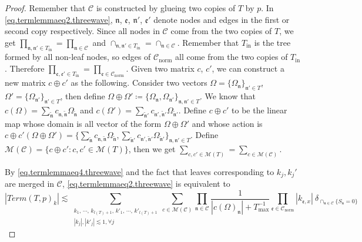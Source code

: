 \begin{proof}
Remember that $\mathcal{C}$ is constructed by glueing two copies of $T$ by $p$. In \eqref{eq.termlemmaeq2.threewave}, $\mathfrak{n}$, $\mathfrak{e}$, $\mathfrak{n}'$, $\mathfrak{e}'$ denote nodes and edges in the first or second copy respectively. Since all nodes in $\mathcal{C}$ come from the two copies of $T$, we get $\prod_{\mathfrak{n}, \mathfrak{n}'\in T_{\text{in}}}=\prod_{\mathfrak{n}\in \mathcal{C}}$ and $\cap_{\mathfrak{n},\mathfrak{n}'\in T_{\text{in}}}=\cap_{\mathfrak{n}\in \mathcal{C}}$. Remember that $T_{\text{in}}$ is the tree formed by all non-leaf nodes, so edges of $\mathcal{C}_{\text{norm}}$ all come from the two copies of $T_{\text{in}}$. Therefore $\prod_{\mathfrak{e},\mathfrak{e}'\in T_{\text{in}}}=\prod_{\mathfrak{e}\in \mathcal{C}_{\text{norm}}}$. Given two matrix $c$, $c'$, we can construct a new matrix $c\oplus c'$ as the following. Consider two vectors $\Omega=\{\Omega_{\mathfrak{n}}\}_{\mathfrak{n}'\in T}$, $\Omega'=\{\Omega_{\mathfrak{n}'}\}_{\mathfrak{n}'\in T}$, then define $\Omega\oplus\Omega'\coloneqq \{\Omega_{\mathfrak{n}},\Omega_{\mathfrak{n}'}\}_{\mathfrak{n},\mathfrak{n}'\in T}$. We know that $c(\Omega)=\sum_{\widetilde{\mathfrak{n}}}c_{\mathfrak{n},\widetilde{\mathfrak{n}}}\Omega_{\widetilde{\mathfrak{n}}}$ and $c(\Omega')=\sum_{\widetilde{\mathfrak{n}}'}c_{\mathfrak{n}',\widetilde{\mathfrak{n}}'}\Omega_{\widetilde{\mathfrak{n}}'}$. Define $c\oplus c'$ to be the linear map whose domain is all vector of the form $\Omega\oplus\Omega'$ and whose action is $c\oplus c'(\Omega\oplus\Omega')=\{\sum_{\widetilde{\mathfrak{n}}}c_{\mathfrak{n},\widetilde{\mathfrak{n}}}\Omega_{\widetilde{\mathfrak{n}}},\sum_{\widetilde{\mathfrak{n}}'}c_{\mathfrak{n}',\widetilde{\mathfrak{n}}'}\Omega_{\widetilde{\mathfrak{n}}'}\}_{\mathfrak{n},\mathfrak{n}'\in T}$. Define $\mathscr{M}(\mathcal{C})=\{c\oplus c':c, c'\in \mathscr{M}(T)\}$, then we get $\sum_{c, c'\in \mathscr{M}(T) }=\sum_{c\in \mathscr{M}(\mathcal{C}) }$.



By \eqref{eq.termlemmaeq4.threewave} and the fact that leaves corresponding to $k_j, k_j'$ are merged in $\mathcal{C}$, \eqref{eq.termlemmaeq2.threewave} is equivalent to 
\begin{equation}\label{eq.termlemmaeq5.threewave}
|Term(T, p)_k|\lesssim \sum_{\substack{k_1,\, \cdots,\, k_{l(T)+1},\, k'_1,\, \cdots,\, k'_{l(T)+1}\\ |k_{j}|, |k'_j|\lesssim 1, \forall j}} \sum_{c\in \mathscr{M}(\mathcal{C}) }\prod_{\mathfrak{n}\in \mathcal{C}}\frac{1}{|c(\Omega)_{\mathfrak{n}}|+T^{-1}_{\text{max}}} \prod_{\mathfrak{e}\in \mathcal{C}_{\text{norm}}}|k_{\mathfrak{e},x}|\ \delta_{\cap_{\mathfrak{n}\in \mathcal{C}} \{S_{\mathfrak{n}}=0\}}
\end{equation}



\end{proof}
